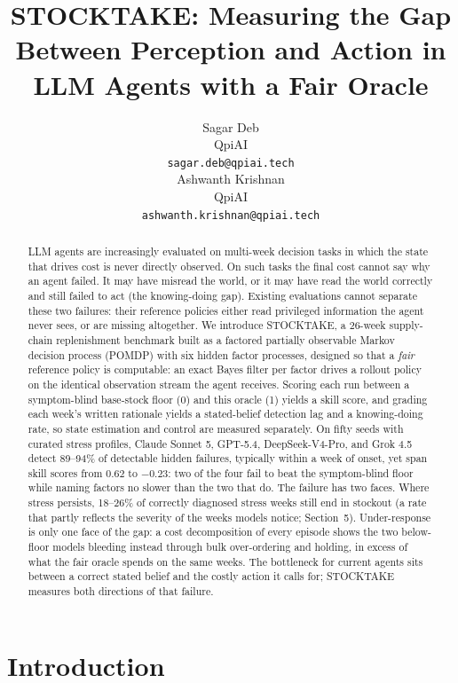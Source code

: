\documentclass{article}
\title{STOCKTAKE: Measuring the Gap Between Perception and Action in LLM Agents with a Fair Oracle}
\author{%
  Sagar Deb\\
  QpiAI\\
  \texttt{sagar.deb@qpiai.tech}\\
  \And
  Ashwanth Krishnan\\
  QpiAI\\
  \texttt{ashwanth.krishnan@qpiai.tech}\\
}
\begin{document}
\maketitle

\begin{abstract}
LLM agents are increasingly evaluated on multi-week decision tasks in
which the state that drives cost is never directly observed. On such tasks
the final cost cannot say why an agent failed. It may have misread the
world, or it may have read the world correctly and still failed to act
(the knowing-doing gap). Existing evaluations cannot separate these two
failures: their reference policies either read privileged information the
agent never sees, or are missing altogether. We introduce STOCKTAKE, a 26-week supply-chain
replenishment benchmark built as a factored partially observable Markov
decision process (POMDP) with six hidden factor processes, designed so that a \emph{fair} reference policy is computable:
an exact Bayes filter per factor drives a rollout policy on the identical
observation stream the agent receives. Scoring each run between a
symptom-blind base-stock floor (0) and this oracle (1) yields a skill
score, and grading each week's written rationale yields a stated-belief
detection lag and a knowing-doing rate, so state estimation and control
are measured separately. On fifty seeds with curated stress profiles,
Claude Sonnet 5, GPT-5.4, DeepSeek-V4-Pro, and Grok 4.5 detect 89--94\%
of detectable hidden failures, typically within a week of onset, yet span skill
scores from $0.62$ to $-0.23$: two of the four fail to beat the
symptom-blind floor while naming factors no slower than the
two that do. The failure has two faces. Where stress persists,
18--26\% of correctly diagnosed stress weeks still end in stockout (a
rate that partly reflects the severity of the weeks models
notice; Section~5). Under-response is only one face of the gap: a cost
decomposition of every episode shows the two below-floor models bleeding
instead through bulk over-ordering and holding, in excess of what the
fair oracle spends on the same weeks. The bottleneck
for current agents sits between a correct stated belief and the costly
action it calls for; STOCKTAKE measures both directions of that failure.
\end{abstract}

\section{Introduction}
\end{document}
